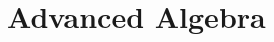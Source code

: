 \documentclass[../satmath.tex]{subfiles}
\begin{document}
\chapter{Advanced Algebra}
\end{document}
